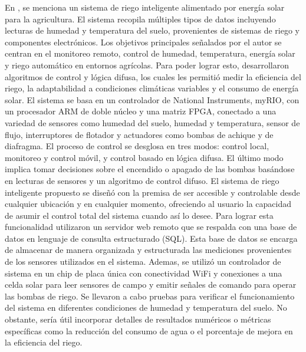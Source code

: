 \bigbreak
En \cite{al-ali_iot-solar_2019}, se menciona un sistema de riego inteligente alimentado por energía solar para la agricultura. El sistema recopila múltiples tipos de datos incluyendo lecturas de humedad y temperatura del suelo, provenientes de sistemas de riego y componentes electrónicos. Los objetivos principales señalados por el autor se centran en el monitoreo remoto, control de humedad, temperatura, energía solar y riego automático en entornos agrícolas. Para poder lograr esto, desarrollaron algoritmos de control y lógica difusa, los cuales les permitió medir la eficiencia del riego, la adaptabilidad a condiciones climáticas variables y el consumo de energía solar. El sistema se basa en un controlador de National Instruments, myRIO, con un procesador ARM de doble núcleo y una matriz FPGA, conectado a una variedad de sensores como humedad del suelo, humedad y temperatura, sensor de flujo, interruptores de flotador y actuadores como bombas de achique y de diafragma. El proceso de control se desglosa en tres modos: control local, monitoreo y control móvil, y control basado en lógica difusa. El último modo implica tomar decisiones sobre el encendido o apagado de las bombas basándose en lecturas de sensores y un algoritmo de control difuso. El sistema de riego inteligente propuesto se diseñó con la premisa de ser accesible y controlable desde cualquier ubicación y en cualquier momento, ofreciendo al usuario la capacidad de asumir el control total del sistema cuando así lo desee. Para lograr esta funcionalidad utilizaron un servidor web remoto que se respalda con una base de datos en lenguaje de consulta estructurado (SQL). Esta base de datos se encarga de almacenar de manera organizada y estructurada las mediciones provenientes de los sensores utilizados en el sistema. Ademas, se utilizó un controlador de sistema en un chip de placa única con conectividad WiFi y conexiones a una celda solar para leer sensores de campo y emitir señales de comando para operar las bombas de riego. Se llevaron a cabo pruebas para verificar el funcionamiento del sistema en diferentes condiciones de humedad y temperatura del suelo. No obstante, sería útil incorporar detalles de resultados numéricos o métricas específicas como la reducción del consumo de agua o el porcentaje de mejora en la eficiencia del riego.

